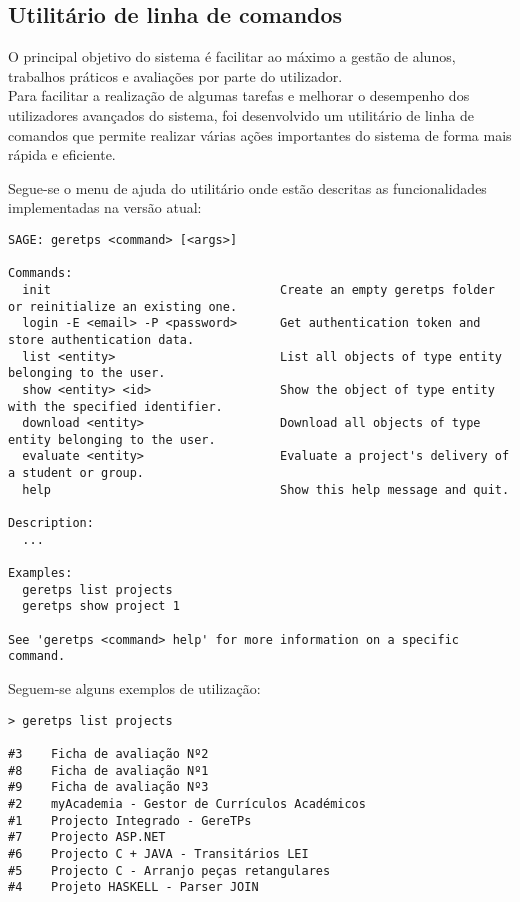 \subsection{Utilitário de linha de comandos}

O principal objetivo do sistema é facilitar ao máximo a gestão de alunos, trabalhos práticos e avaliações por parte do utilizador. \\

Para facilitar a realização de algumas tarefas e melhorar o desempenho dos utilizadores avançados do sistema, foi desenvolvido um utilitário de linha de comandos que permite realizar várias ações importantes do sistema de forma mais rápida e eficiente.

Segue-se o menu de ajuda do utilitário onde estão descritas as funcionalidades implementadas na versão atual:

\begin{verbatim}
SAGE: geretps <command> [<args>]

Commands:
  init                                Create an empty geretps folder or reinitialize an existing one.
  login -E <email> -P <password>      Get authentication token and store authentication data.
  list <entity>                       List all objects of type entity belonging to the user.
  show <entity> <id>                  Show the object of type entity with the specified identifier.
  download <entity>                   Download all objects of type entity belonging to the user.
  evaluate <entity>                   Evaluate a project's delivery of a student or group.
  help                                Show this help message and quit.

Description:
  ...

Examples:
  geretps list projects
  geretps show project 1

See 'geretps <command> help' for more information on a specific command.
\end{verbatim}

Seguem-se alguns exemplos de utilização:

\begin{verbatim}
> geretps list projects

#3    Ficha de avaliação Nº2
#8    Ficha de avaliação Nº1
#9    Ficha de avaliação Nº3
#2    myAcademia - Gestor de Currículos Académicos
#1    Projecto Integrado - GereTPs
#7    Projecto ASP.NET
#6    Projecto C + JAVA - Transitários LEI
#5    Projecto C - Arranjo peças retangulares
#4    Projeto HASKELL - Parser JOIN
\end{verbatim}

